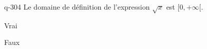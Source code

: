 \begin{truefalse}{q-304}
Le domaine de définition de l'expression $\sqrt{x}$ est $[0,+\infty[$.
\item* Vrai
\item Faux
\end{truefalse}

